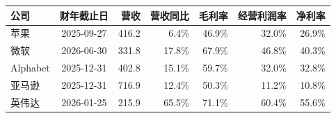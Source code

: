 \begin{tabular}{l c r r r r r}
\toprule
公司 & 财年截止日 & 营收 & 营收同比 & 毛利率 & 经营利润率 & 净利率 \\
\midrule
苹果 & 2025-09-27 & 416.2 & 6.4\% & 46.9\% & 32.0\% & 26.9\% \\
微软 & 2026-06-30 & 331.8 & 17.8\% & 67.9\% & 46.8\% & 40.3\% \\
Alphabet & 2025-12-31 & 402.8 & 15.1\% & 59.7\% & 32.0\% & 32.8\% \\
亚马逊 & 2025-12-31 & 716.9 & 12.4\% & 50.3\% & 11.2\% & 10.8\% \\
英伟达 & 2026-01-25 & 215.9 & 65.5\% & 71.1\% & 60.4\% & 55.6\% \\
\bottomrule
\end{tabular}
